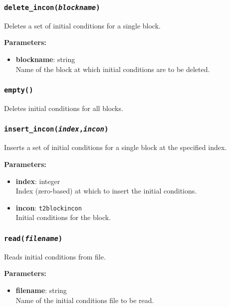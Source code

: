 \subsubsection{\texttt{delete\_incon(\emph{blockname})}}
\label{sec:t2incon:delete_incon}

Deletes a set of initial conditions for a single block.

\textbf{Parameters:}
\begin{itemize}
\item \textbf{blockname}: string\\
  Name of the block at which initial conditions are to be deleted.
\end{itemize}

\subsubsection{\texttt{empty()}}
\label{sec:t2incon:empty}

Deletes initial conditions for all blocks.

\subsubsection{\texttt{insert\_incon(\emph{index},\emph{incon})}}
\label{sec:t2incon:insert_incon}

Inserts a set of initial conditions for a single block at the specified index.

\textbf{Parameters:}
\begin{itemize}
\item \textbf{index}: integer\\
  Index (zero-based) at which to insert the initial conditions.
\item \textbf{incon}: \texttt{t2blockincon}\\
  Initial conditions for the block.
\end{itemize}

\subsubsection{\texttt{read(\emph{filename})}}
\label{sec:t2incon:read}

Reads initial conditions from file.

\textbf{Parameters:}
\begin{itemize}
\item \textbf{filename}: string\\
  Name of the initial conditions file to be read.
\end{itemize}

